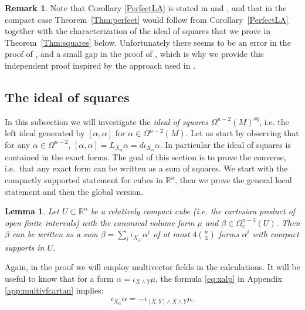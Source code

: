 \documentclass{article}
\newcommand{\sq}{\mathrm{sq}}
\newtheorem{Lemma}[Theorem]{Lemma}
\theoremstyle{definition}
\newtheorem{Remark}[Theorem]{Remark}
\begin{document}
\begin{Remark}
Note that Corollary \ref{PerfectLA} is stated in \cite{Lichnerowicz1974} and 
\cite[Chapter X.3]{Omori1974}, and that in the compact case
Theorem~\ref{Thm:perfect} would follow from Corollary~\ref{PerfectLA} together with
the characterization of the ideal of squares that we prove in
Theorem~\ref{Thm:squares} below. Unfortunately there seems to be an error in the proof of \cite{Omori1974},
and a small gap in the proof of \cite{Lichnerowicz1974}, which is why we provide this independent proof inspired by the approach used in \cite{Omori1974}. 
\end{Remark}




\subsection{The ideal of squares}
In this subsection we will investigate the \emph{ideal of squares} $\Omega^{n-2}(M)^{\sq}$, i.e. the left ideal generated by $[\alpha,\alpha]$ for $\alpha\in \Omega^{n-2}(M)$. Let us start by observing that for any $\alpha\in \Omega^{n-2}$, $[\alpha,\alpha]=L_{X_{\alpha}}\alpha=d\iota_{X_\alpha}\alpha$. In particular the ideal of squares is contained in the exact forms. The goal of this section is to prove the converse, i.e.\ that any exact form can be written as a sum of squares. We start with the compactly supported statement for cubes in $\mathbb R^n$, then we prove the general local statement and then the global version. 

\begin{Lemma} \label{lem:cubesquares}
Let $U\subset \mathbb R^n$ be a relatively compact cube (i.e. the cartesian product of open finite intervals) with the canonical volume form $\mu$ and $\beta\in \Omega^{n-3}_c(U)$.
Then $\beta$ can be written as a sum $\beta = \sum_{i}\iota_{X_{\alpha^i}}\alpha^i$ 
of at most $4 \binom{n}{3}$ forms $\alpha^i$ with compact supports in $U$.  
\end{Lemma}


Again, in the proof we will employ multivector fields in the calculations. It will be useful to know that for a form $\alpha={\iota_{X\wedge Y}\mu}$, the formula \eqref{eq:xalp} in Appendix \ref{app:multivfcartan} implies:
\begin{align}\label{eq:contractiondecomposable}
    \iota_{X_\alpha}\alpha=-\iota_{[X,Y]\wedge X\wedge Y}\mu.
\end{align}
\end{document}
